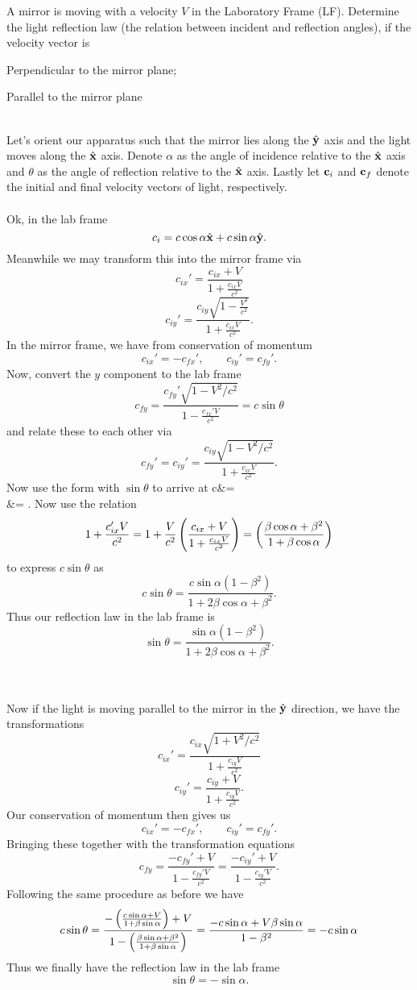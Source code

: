 \documentclass[10pt,letterpaper]{article}
\begin{document}
\eenum
\item
A mirror is moving with a velocity $V$ in the Laboratory Frame (LF). Determine the light reflection law
(the relation between incident and reflection angles), if the velocity vector is 
\benum
\item
Perpendicular to the mirror plane;
\item
Parallel to the mirror plane \\ \\
\eenum
\benum
\item
Let's orient our apparatus such that the mirror lies along the $\hat{\mathbf{y}}$ axis and the light moves along the $\hat{\mathbf{x}}$ axis. Denote $\alpha$ as the angle of incidence relative to the $\hat{\mathbf{x}}$ axis and $\theta$ as the 
angle of reflection relative to the $\hat{\mathbf{x}}$ axis. Lastly let $\mathbf{c}_i$ and $\mathbf{c}_f$ denote the initial
and final velocity vectors of light, respectively. \\ \\
Ok, in the lab frame 
\[
	c_i = c\cos\alpha \hat{\mathbf{x}}+c\sin\alpha\hat{\mathbf{y}}.
\]
Meanwhile we may transform this into the mirror frame via
\[
	c_{ix}' = \frac{c_{ix}+V}{1+\frac{c_{ix}V}{c^2}}
\]
\[
	c_{iy}' = \frac{c_{iy}\sqrt{1-\frac{V^2}{c^2}}}{1+\frac{c_{ix}V}{c^2}}.
\]
In the mirror frame, we have from conservation of momentum
\[
	c_{ix}' = -c_{fx}',\qquad c_{iy}'=c_{fy}'.
\]
Now, convert the $y$ component to the lab frame
\[
	c_{fy} = \frac{c_{fy}'\sqrt{1-V^2/c^2}}{1-\frac{c_{fx}'V}{c^2}} = c\sin\theta
\]
and relate these to each other via
\[
	c_{fy}' = c_{iy}' = \frac{c_{iy}\sqrt{1-V^2/c^2}}{1+\frac{c_{ix}V}{c^2}}.
\]
Now use the form with $\sin\theta$ to arrive at
\ba
	c\sin\theta &= \\
	&= .
\ea
Now use the relation
\[
	1+\frac{c_{ix}'V}{c^2} = 1+\frac{V}{c^2}\left(\frac{c_{ix}+V}{1+\frac{c_{ix}V}{c^2}}\right) =
	\left(\frac{\beta\cos\alpha+\beta^2}{1+\beta\cos\alpha}\right)
\]
to express $c\sin\theta$ as
\[
	c\sin\theta = \frac{c\sin\alpha(1-\beta^2)}{1+2\beta\cos\alpha+\beta^2}.
\]
Thus our reflection law in the lab frame is
\[
	\sin\theta = \frac{\sin\alpha(1-\beta^2)}{1+2\beta\cos\alpha+\beta^2}.
\]
\\ \\
\item
Now if the light is moving parallel to the mirror in the $\hat{\mathbf{y}}$ direction, we have the transformations
\[
	c_{ix}' =  \frac{c_{ix}\sqrt{1+V^2/c^2}}{1+\frac{c_{iy}V}{c^2}}
\]
\[
	c_{iy}' = \frac{c_{iy}+V}{1+\frac{c_{iy}V}{c^2}}.
\]
Our conservation of momentum then gives us
\[
	c_{ix}' = -c_{fx}',\qquad c_{iy}' = c_{fy}'.
\]
Bringing these together with the transformation equations
\[
	c_{fy} = \frac{-c_{fy}'+V}{1-\frac{c_{fy}'V}{c^2}} = \frac{-c_{iy}'+V}{1-\frac{c_{iy}'V}{c^2}}.
\]
Following the same procedure as before we have
\[
	c\sin\theta = \frac{-\left(\frac{c\sin\alpha+V}{1+\beta\sin\alpha}\right)+V}{1-\left(\frac{\beta\sin\alpha+\beta^2}{1+
	\beta\sin\alpha}\right)} = \frac{-c\sin\alpha+V\beta\sin\alpha}{1-\beta^2} = -c\sin\alpha
\]
Thus we finally have the reflection law in the lab frame
\[
	\sin\theta = -\sin\alpha.
\]
\eenum
\eenum 
\end{document}
